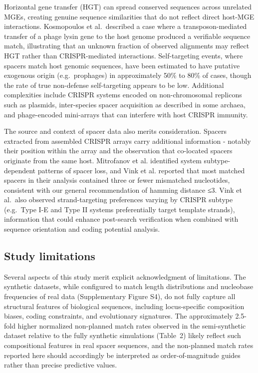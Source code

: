 \documentclass[
]{article}
\begin{document}
Horizontal gene transfer (HGT) can spread conserved sequences across
unrelated MGEs, creating genuine sequence similarities that do not
reflect direct host-MGE interactions. Kosmopoulos et al.~described a
case where a transposon-mediated transfer of a phage lysin gene to the
host genome produced a verifiable sequence
match\autocite{Kosmopoulos_2023}, illustrating that an unknown fraction
of observed alignments may reflect HGT rather than CRISPR-mediated
interactions. Self-targeting events, where spacers match host genomic
sequences, have been estimated to have putative exogenous origin
(e.g.~prophages) in approximately 50\%\autocite{Stern_2010} to
80\%\autocite{Shmakov_2017} of cases, though the rate of true
non-defense self-targeting appears to be low\autocite{Shmakov_2017}.
Additional complexities include CRISPR systems encoded on
non-chromosomal replicons such as
plasmids\autocite{Maier_2018,Zhang_2025}, inter-species spacer
acquisition as described in some archaea\autocite{Turgeman_Grott_2018},
and phage-encoded mini-arrays that can interfere with host CRISPR
immunity\autocite{Shmakov_2023}.

The source and context of spacer data also merits consideration. Spacers
extracted from assembled CRISPR arrays carry additional information -
notably their position within the array and the observation that
co-located spacers originate from the same host. Mitrofanov et
al.\autocite{Mitrofanov2025} identified system subtype-dependent
patterns of spacer loss, and Vink et al.\autocite{Vink2021} reported
that most matched spacers in their analysis contained three or fewer
mismatched nucleotides, consistent with our general recommendation of
hamming distance ≤3. Vink et al.~also observed strand-targeting
preferences varying by CRISPR subtype (e.g.~Type I-E and Type II systems
preferentially target template strands), information that could enhance
post-search verification when combined with sequence orientation and
coding potential analysis.

\subsection{Study limitations}\label{sec-limitations}

Several aspects of this study merit explicit acknowledgment of
limitations. The synthetic datasets, while configured to match length
distributions and nucleobase frequencies of real data (Supplementary
Figure S4), do not fully capture all structural features of biological
sequences, including locus-specific composition biases, coding
constraints, and evolutionary signatures. The approximately 2.5-fold
higher normalized non-planned match rates observed in the semi-synthetic
dataset relative to the fully synthetic simulations (Table~2) likely
reflect such compositional features in real spacer sequences, and the
non-planned match rates reported here should accordingly be interpreted
as order-of-magnitude guides rather than precise predictive values.
\end{document}

